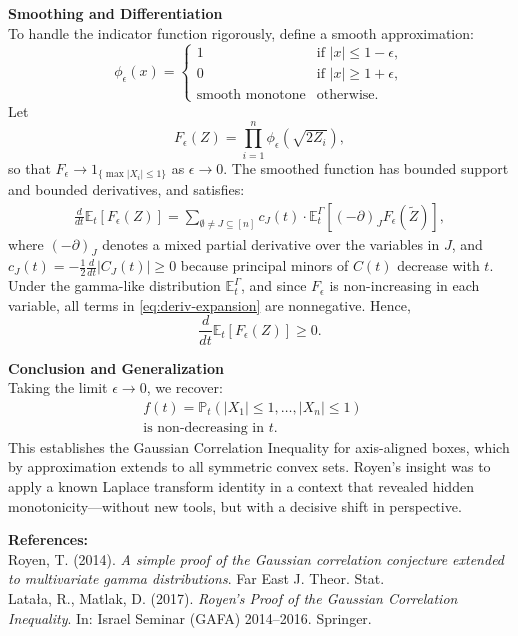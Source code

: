 \begin{technical}
\noindent\textbf{Smoothing and Differentiation}\\[0.5em]
To handle the indicator function rigorously, define a smooth approximation:
\[
\phi_\epsilon(x) = 
\begin{cases}
1 & \text{if } |x| \le 1 - \epsilon, \\
0 & \text{if } |x| \ge 1 + \epsilon, \\
\text{smooth monotone} & \text{otherwise}.
\end{cases}
\]
Let
\[
F_\epsilon(Z) = \prod_{i=1}^n \phi_\epsilon\left(\sqrt{2Z_i}\right),
\]
so that \( F_\epsilon \to 1_{\{\max |X_i| \le 1\}} \) as \( \epsilon \to 0 \). The smoothed function has bounded support and bounded derivatives, and satisfies:
\begin{align}
\frac{d}{dt} \mathbb{E}_t[F_\epsilon(Z)] 
= \sum_{\emptyset \neq J \subseteq [n]} c_J(t) \cdot \mathbb{E}^{\Gamma}_t \left[ (-\partial)_J F_\epsilon(\tilde Z) \right], \label{eq:deriv-expansion}
\end{align}
where \( (-\partial)_J \) denotes a mixed partial derivative over the variables in \( J \), and \( c_J(t) = -\frac{1}{2} \frac{d}{dt} |C_J(t)| \ge 0 \) because principal minors of \( C(t) \) decrease with \( t \). Under the gamma-like distribution \( \mathbb{E}^\Gamma_t \), and since \( F_\epsilon \) is non-increasing in each variable, all terms in \eqref{eq:deriv-expansion} are nonnegative. Hence,
\[
\frac{d}{dt} \mathbb{E}_t[F_\epsilon(Z)] \ge 0.
\]

\noindent\textbf{Conclusion and Generalization}\\[0.5em]
Taking the limit \( \epsilon \to 0 \), we recover:
\begin{align} 
f(t) = \mathbb{P}_t\left( |X_1| \le 1, \dots, |X_n| \le 1 \right) \quad \\\text{is non-decreasing in } t.
\end{align}
This establishes the Gaussian Correlation Inequality for axis-aligned boxes, which by approximation extends to all symmetric convex sets. Royen's insight was to apply a known Laplace transform identity in a context that revealed hidden monotonicity—without new tools, but with a decisive shift in perspective.

\vspace{0.5em}
\noindent\textbf{References:}\\
Royen, T. (2014). \textit{A simple proof of the Gaussian correlation conjecture extended to multivariate gamma distributions}. Far East J. Theor. Stat.\\
Latała, R., Matlak, D. (2017). \textit{Royen’s Proof of the Gaussian Correlation Inequality}. In: Israel Seminar (GAFA) 2014–2016. Springer.
\end{technical}
